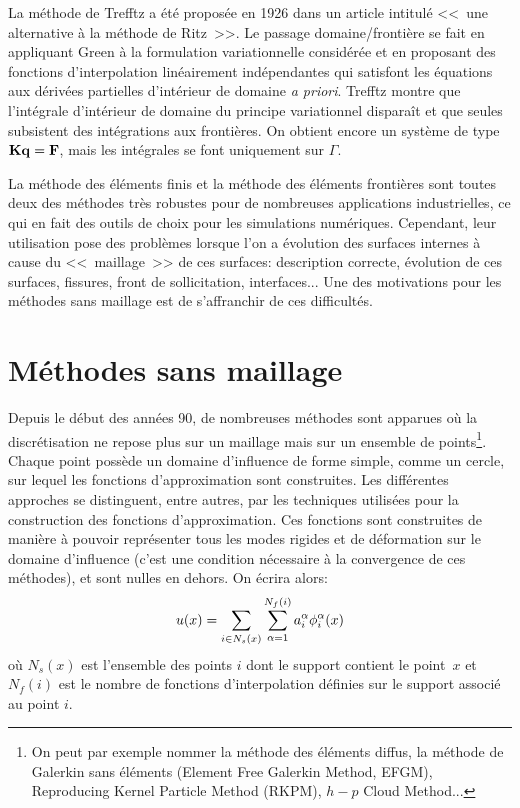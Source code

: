 \medskip
La méthode de Trefftz a été proposée en 1926 dans un article intitulé <<~une alternative à la méthode de Ritz~>>. Le passage domaine/frontière se fait en appliquant Green à la formulation variationnelle considérée et en proposant des fonctions d'interpolation linéairement indépendantes qui satisfont les équations aux dérivées partielles d'intérieur de domaine \emph{a priori}. Trefftz montre que l'intégrale d'intérieur de domaine du principe variationnel disparaît et que seules subsistent des intégrations aux frontières. 
On obtient encore un système de type $\MM{K}\VV{q}=\VV{F}$, mais les intégrales se font uniquement
sur $\Gamma$.

\medskip
La méthode des éléments finis et la méthode des éléments frontières sont toutes deux des méthodes très robustes pour de nombreuses applications industrielles, ce qui en fait des outils de choix pour les simulations numériques. Cependant, leur utilisation pose des problèmes lorsque l'on a évolution des surfaces internes à cause du <<~maillage~>> de ces surfaces: description correcte, évolution de ces surfaces, fissures, front de sollicitation, interfaces... Une des motivations pour les méthodes sans maillage est de s'affranchir de ces difficultés.



\medskip
\section{Méthodes sans maillage}\label{Sec-meshless}

Depuis le début des années 90, de nombreuses méthodes sont apparues où la discrétisation ne repose plus sur un maillage mais sur un ensemble de points\footnote{On peut par exemple nommer la méthode des éléments diffus, la méthode de Galerkin sans éléments (Element Free Galerkin Method, EFGM), Reproducing Kernel Particle Method (RKPM), $h-p$ Cloud Method...}. Chaque point possède un domaine d'influence de forme simple, comme un cercle, sur lequel les fonctions d'approximation sont construites. Les différentes approches se distinguent, entre autres, par les techniques utilisées pour la construction des fonctions d'approximation. Ces fonctions sont construites de manière à pouvoir représenter tous les modes rigides et de déformation sur le domaine d'influence (c'est une condition nécessaire à la convergence de ces méthodes), et sont nulles en dehors. On écrira alors:
\begin{equation}
u(x) = \displaystyle\sum_{i\in N_s(x)}\displaystyle\sum_{\alpha=1}^{N_f(i)} a_i^\alpha \phi_i^\alpha(x)
\end{equation}
où $N_s(x)$ est l'ensemble des points $i$ dont le support contient le point~$x$ et $N_f (i)$ est le nombre de fonctions d'interpolation définies sur le support associé au point $i$.

